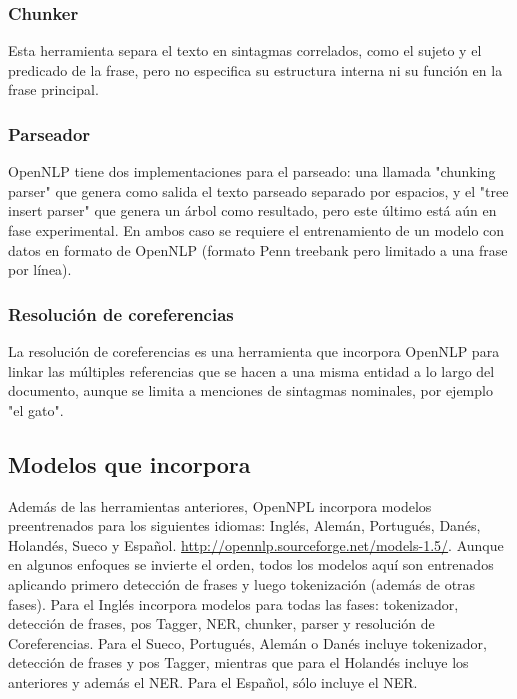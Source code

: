 \subsubsection{Chunker}
 Esta herramienta separa el texto en sintagmas correlados, como el sujeto y el predicado de la frase, pero no especifica su estructura interna ni su función en la frase principal. 
\subsubsection{Parseador}
 OpenNLP tiene dos implementaciones para el parseado: una llamada "chunking parser" que genera como salida el texto parseado separado por espacios, y el "tree insert parser" que genera un árbol como resultado, pero este último está aún en fase experimental. En ambos caso se requiere el entrenamiento de un modelo con datos en formato de OpenNLP (formato Penn treebank pero limitado a una frase por línea).
\subsubsection{Resolución de coreferencias}
La resolución de coreferencias es una herramienta que incorpora OpenNLP para linkar las múltiples referencias que se hacen a una misma entidad a lo largo del documento, aunque se limita a menciones de sintagmas nominales, por ejemplo \textsf{"el gato"}. 
\subsection{Modelos que incorpora}
Además de las herramientas anteriores, OpenNPL incorpora modelos preentrenados para los siguientes idiomas: Inglés, Alemán, Portugués, Danés, Holandés, Sueco y Español. \url{http://opennlp.sourceforge.net/models-1.5/}. Aunque en algunos enfoques se invierte el orden, todos los modelos aquí son entrenados aplicando primero detección de frases y luego tokenización (además de otras fases). \newline
Para el Inglés incorpora modelos para todas las fases: tokenizador, detección de frases, pos Tagger, NER, chunker, parser y resolución de Coreferencias. Para el Sueco, Portugués, Alemán o Danés incluye tokenizador, detección de frases y pos Tagger, mientras que para el Holandés incluye los anteriores y además el NER. Para el Español, sólo incluye el NER.

